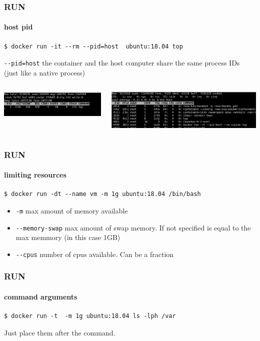 \begin{frame}[fragile]
\frametitle{RUN}
\framesubtitle{host pid}
\begin{lstlisting}
$ docker run -it --rm --pid=host  ubuntu:18.04 top
\end{lstlisting}
\lstinline!--pid=host! the container and the host computer share the same process IDs (just like a native process)
\begin{columns}
\begin{column}{.50\textwidth}
\includegraphics[width=\columnwidth]{./Figure/commands/pid-normal}
\end{column}
\begin{column}{.50\textwidth}
\includegraphics[width=\columnwidth]{./Figure/commands/pid-host}
\end{column}
\end{columns}
\end{frame}

\begin{frame}[fragile]
\frametitle{RUN}
\framesubtitle{limiting resources}
\begin{lstlisting}
$ docker run -dt --name vm -m 1g ubuntu:18.04 /bin/bash
\end{lstlisting}
\begin{itemize}
\item \lstinline!-m! max amount of memory available
\item \lstinline!--memory-swap! max amount of swap memory. If not specified is equal to the max memmory (in this case 1GB)
\item \lstinline!--cpus! number of cpus available. Can be a fraction
\end{itemize}
\end{frame}

\begin{frame}[fragile]
\frametitle{RUN}
\framesubtitle{command arguments}
\begin{lstlisting}
$ docker run -t  -m 1g ubuntu:18.04 ls -lph /var
\end{lstlisting}
Just place them after the command.
\end{frame}

